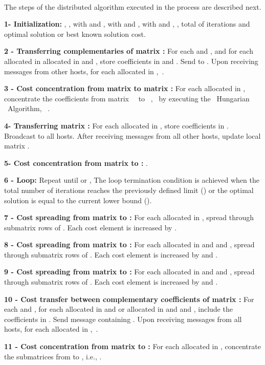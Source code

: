 \documentclass[authoryear,12pt,a4paper,times]{elsarticle}
\begin{document}
\

The steps of the distributed algorithm executed in the process  are described next.

\noindent
{\bf 1- Initialization:}  ,   ,      
    with  and ,
   with  and ,
   with  and ,  
, 
 total of iterations and   optimal solution or best known solution cost.\

\noindent
{\bf 2 - Transferring   complementaries of matrix :} For each  and , and for each  allocated in  allocated in  and , 
store coefficients  in   and . Send   to   . 
Upon receiving messages from other hosts,  for each  allocated in ,\ . \ \

\noindent
{\bf 3 -  Cost concentration from matrix  to matrix  :} For each  allocated in  , concentrate  the  coefficients from 
matrix \  \ to \ , \ by executing the \ Hungarian \ Algorithm, \   .\

\noindent
{\bf 4- Transferring  matrix :} For each  allocated in  , 
store coefficients  in .   Broadcast  to all hosts.
After receiving messages from all other hosts, update local matrix . 


\noindent
{\bf 5- Cost concentration from matrix  to :} .

\noindent
{\bf 6 - Loop:} Repeat until  or , 
 The loop termination condition is  achieved when the total number of iterations reaches the previously defined
 limit () or the optimal solution is equal to the current lower bound ().

\noindent
{\bf 7 - Cost spreading from matrix  to :}  
For each  allocated in , 
spread  through  submatrix rows of  . 
Each cost element  is increased by  .

\noindent
{\bf 8 - Cost spreading from matrix  to :}  
For each  allocated in  and  and , 
spread  through  submatrix rows of .
Each cost element  is increased by   and . 

\noindent
{\bf 9 - Cost spreading from matrix  to :} 
For each  allocated in  and  and ,  
spread  through  submatrix rows of .
Each cost element  is increased by  and . 

\noindent
{\bf 10 - Cost transfer between complementary coefficients of matrix :}
For each  and , for each  allocated in  and  or  allocated in  and 
and , include the coefficients  in .
Send message containing .
Upon receiving messages from all hosts, for each  allocated in ,\ 
. \ 

\noindent
{\bf 11 - Cost concentration from matrix  to :} For each  allocated in , concentrate 
the submatrices from  to , i.e.,  .
\end{document}
